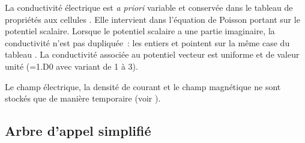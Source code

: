 \bigskip
La conductivité électrique est {\it a priori} variable et
conservée dans le tableau de propriétés aux cellules
. Elle intervient dans l'équation de
Poisson portant sur le potentiel scalaire. Lorsque le potentiel scalaire a une
partie imaginaire, la conductivité n'est pas dupliquée~:
les entiers  et  pointent sur la
même case du tableau . La conductivité associée au potentiel
vecteur est uniforme et de valeur unité (=1.D0
avec  variant de 1 à 3).

Le champ électrique, la densité de courant et le champ magnétique ne sont
stockés que de manière temporaire (voir ).


\newpage

\subsection*{Arbre d'appel simplifié}

